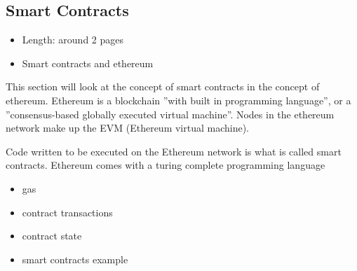 \subsection{Smart Contracts}

\begin{itemize}
  \item Length: around 2 pages
  \item Smart contracts and ethereum
\end{itemize}

This section will look at the concept of smart contracts in the concept of ethereum.
Ethereum is a blockchain ''with built in programming language'', or a ''consensus-based globally executed virtual machine''. Nodes in the ethereum network make up the EVM (Ethereum virtual machine).

Code written to be executed on the Ethereum network is what is called smart contracts.
Ethereum comes with a turing complete programming language

\begin{itemize}
  \item gas
  \item contract transactions
  \item contract state  
  \item smart contracts example
\end{itemize}

